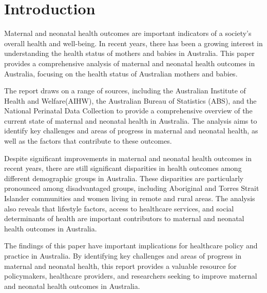 \section{Introduction}
Maternal and neonatal health outcomes are important indicators of a society's overall health and well-being. In recent years, there has been a growing interest in understanding the health status of mothers and babies in Australia. This paper provides a comprehensive analysis of maternal and neonatal health outcomes in Australia, focusing on the health status of Australian mothers and babies.

The report draws on a range of sources, including the Australian Institute of Health and Welfare(AIHW), the Australian Bureau of Statistics (ABS), and the National Perinatal Data Collection to provide a comprehensive overview of the current state of maternal and neonatal health in Australia. The analysis aims to identify key challenges and areas of progress in maternal and neonatal health, as well as the factors that contribute to these outcomes.

Despite significant improvements in maternal and neonatal health outcomes in recent years, there are still significant disparities in health outcomes among different demographic groups in Australia. These disparities are particularly pronounced among disadvantaged groups, including Aboriginal and Torres Strait Islander communities and women living in remote and rural areas. The analysis also reveals that lifestyle factors, access to healthcare services, and social determinants of health are important contributors to maternal and neonatal health outcomes in Australia.

The findings of this paper have important implications for healthcare policy and practice in Australia. By identifying key challenges and areas of progress in maternal and neonatal health, this report provides a valuable resource for policymakers, healthcare providers, and researchers seeking to improve maternal and neonatal health outcomes in Australia. 